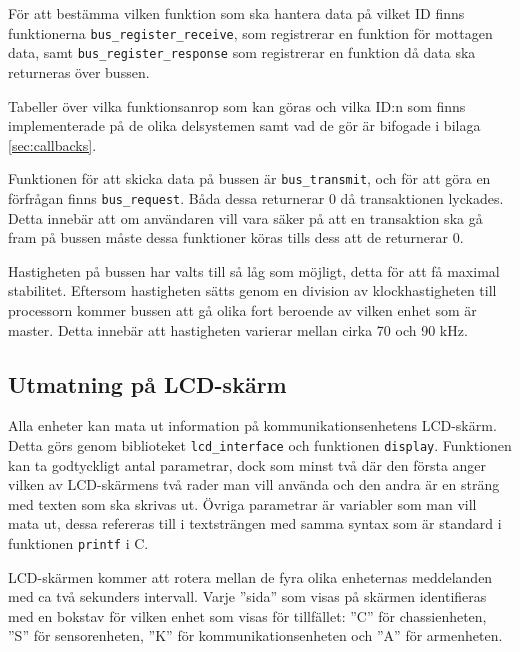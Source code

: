 För att bestämma vilken funktion som ska hantera data på vilket ID finns funktionerna \texttt{bus\_register\_receive}, som registrerar en funktion för mottagen data, samt \texttt{bus\_register\_response} som registrerar en funktion då data ska returneras över bussen.

Tabeller över vilka funktionsanrop som kan göras och vilka ID:n som finns implementerade på de olika delsystemen samt vad de gör är bifogade i bilaga \ref{sec:callbacks}.

Funktionen för att skicka data på bussen är \verb|bus_transmit|, och för att göra en förfrågan finns \verb|bus_request|. Båda dessa returnerar 0 då transaktionen lyckades. Detta innebär att om användaren vill vara säker på att en transaktion ska gå fram på bussen måste dessa funktioner köras tills dess att de returnerar 0.

Hastigheten på bussen har valts till så låg som möjligt, detta för att få maximal stabilitet. Eftersom hastigheten sätts genom en division av klockhastigheten till processorn kommer bussen att gå olika fort beroende av vilken enhet som är master. Detta innebär att hastigheten varierar mellan cirka 70 och 90 kHz.

\subsection{Utmatning på LCD-skärm}
\label{sec:lcd_interface}

Alla enheter kan mata ut information på kommunikationsenhetens LCD-skärm. Detta görs genom biblioteket \verb|lcd_interface| och funktionen \verb|display|. Funktionen kan ta godtyckligt antal parametrar, dock som minst två där den första anger vilken av LCD-skärmens två rader man vill använda och den andra är en sträng med texten som ska skrivas ut. Övriga parametrar är variabler som man vill mata ut, dessa refereras till i textsträngen med samma syntax som är standard i funktionen \verb|printf| i C.

LCD-skärmen kommer att rotera mellan de fyra olika enheternas meddelanden med ca två sekunders intervall. Varje ''sida'' som visas på skärmen identifieras med en bokstav för vilken enhet som visas för tillfället: ''C'' för chassienheten, ''S'' för sensorenheten, ''K'' för kommunikationsenheten och ''A'' för armenheten.

